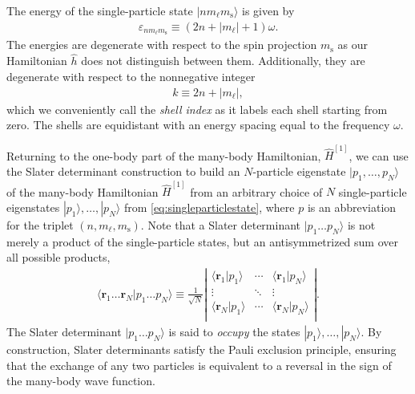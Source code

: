 The energy of the single-particle state $|n m_\ell m_{\mathrm{s}}\rangle$ is given by
\begin{align} \label{eq:energysingleparticlestate}
  \varepsilon_{n m_\ell m_{\mathrm{s}}} \equiv (2 n + |m_\ell| + 1) \omega.
\end{align}
The energies are degenerate with respect to the spin projection $m_{\mathrm{s}}$ as our Hamiltonian $\hat{h}$ does not distinguish between them.  Additionally, they are degenerate with respect to the nonnegative integer
\begin{align} \label{eq:shell_index}
  k \equiv 2 n + |m_\ell|,
\end{align}
which we conveniently call the \textit{shell index} as it labels each shell starting from zero.  The shells are equidistant with an energy spacing equal to the frequency $\omega$.

Returning to the one-body part of the many-body Hamiltonian, $\hat{H}^{[1]}$, we can use the Slater determinant construction to build an $N$-particle eigenstate $|p_1, \ldots, p_N\rangle$ of the many-body Hamiltonian $\hat{H}^{[1]}$ from an arbitrary choice of $N$ single-particle eigenstates $|p_1\rangle, \ldots, |p_N\rangle$ from \eqref{eq:singleparticlestate}, where $p$ is an abbreviation for the triplet $(n, m_\ell, m_{\mathrm{s}})$.  Note that a Slater determinant $|p_1 \ldots p_N\rangle$ is not merely a product of the single-particle states, but an antisymmetrized sum over all possible products,
\begin{align*}
  \langle \bm{r}_1 \ldots \bm{r}_N | p_1 \ldots p_N \rangle \equiv
  \frac{1}{\sqrt{N}} \left|
  \begin{matrix}
    \langle \bm{r}_1 | p_1 \rangle & \cdots & \langle \bm{r}_1 | p_N \rangle \\
    \vdots & \ddots & \vdots \\
    \langle \bm{r}_N | p_1 \rangle & \cdots & \langle \bm{r}_N | p_N \rangle \\
  \end{matrix}
  \right|.
\end{align*}
The Slater determinant $|p_1 \ldots p_N\rangle$ is said to \textit{occupy} the states $|p_1\rangle, \ldots, |p_N\rangle$.  By construction, Slater determinants satisfy the Pauli exclusion principle, ensuring that the exchange of any two particles is equivalent to a reversal in the sign of the many-body wave function.

